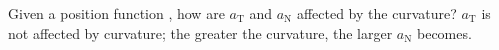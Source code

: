 {Given a position function \vrt, how are $a_{\text{T}}$ and $a_{\text{N}}$ affected by the curvature?
}
{$a_{\text{T}}$ is not affected by curvature; the greater the curvature, the larger $a_{\text{N}}$ becomes.
}